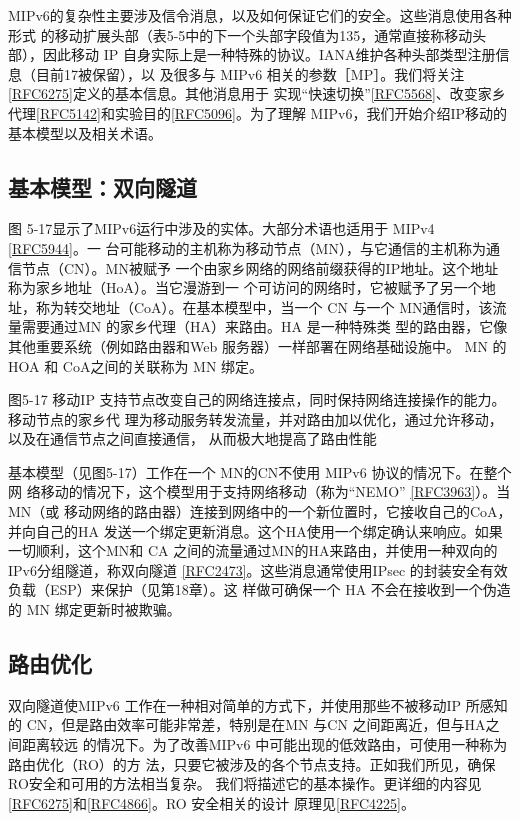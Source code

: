 MIPv6的复杂性主要涉及信令消息，以及如何保证它们的安全。这些消息使用各种形式
的移动扩展头部（表5-5中的下一个头部字段值为135，通常直接称移动头部），因此移动
IP 自身实际上是一种特殊的协议。IANA维护各种头部类型注册信息（目前17被保留），以
及很多与 MIPv6
相关的参数［MP］。我们将关注\href{https://www.rfc-editor.org/rfc/rfc6275}{[RFC6275]}定义的基本信息。其他消息用于
实现“快速切换”\href{https://www.rfc-editor.org/rfc/rfc5568}{[RFC5568]}、改变家乡代理\href{https://www.rfc-editor.org/rfc/rfc5142}{[RFC5142]}和实验目的\href{https://www.rfc-editor.org/rfc/rfc5096}{[RFC5096]}。为了理解
MIPv6，我们开始介绍IP移动的基本模型以及相关术语。

\subsection{基本模型：双向隧道}
图 5-17显示了MIPv6运行中涉及的实体。大部分术语也适用于 MIPv4
\href{https://www.rfc-editor.org/rfc/rfc5944}{[RFC5944]}。一
台可能移动的主机称为移动节点（MN），与它通信的主机称为通信节点（CN）。MN被赋予
一个由家乡网络的网络前缀获得的IP地址。这个地址称为家乡地址（HoA）。当它漫游到一
个可访问的网络时，它被赋予了另一个地址，称为转交地址（CoA）。在基本模型中，当一个
CN 与一个 MN通信时，该流量需要通过MN 的家乡代理（HA）来路由。HA 是一种特殊类
型的路由器，它像其他重要系统（例如路由器和Web 服务器）一样部署在网络基础设施中。
MN 的HOA 和 CoA之间的关联称为 MN 绑定。

图5-17 移动IP 支持节点改变自己的网络连接点，同时保持网络连接操作的能力。移动节点的家乡代
理为移动服务转发流量，并对路由加以优化，通过允许移动，以及在通信节点之间直接通信，
从而极大地提高了路由性能

基本模型（见图5-17）工作在一个 MN的CN不使用 MIPv6 协议的情况下。在整个网
络移动的情况下，这个模型用于支持网络移动（称为“NEMO”
\href{https://www.rfc-editor.org/rfc/rfc3963}{[RFC3963]}）。当MN（或
移动网络的路由器）连接到网络中的一个新位置时，它接收自己的CoA，并向自己的HA
发送一个绑定更新消息。这个HA使用一个绑定确认来响应。如果一切顺利，这个MN和
CA 之间的流量通过MN的HA来路由，并使用一种双向的IPv6分组隧道，称双向隧道
\href{https://www.rfc-editor.org/rfc/rfc2473}{[RFC2473]}。这些消息通常使用IPsec
的封装安全有效负载（ESP）来保护（见第18章）。这
样做可确保一个 HA 不会在接收到一个伪造的 MN 绑定更新时被欺骗。

\subsection{路由优化}
双向隧道使MIPv6 工作在一种相对简单的方式下，并使用那些不被移动IP 所感知的
CN，但是路由效率可能非常差，特别是在MN 与CN 之间距离近，但与HA之间距离较远
的情况下。为了改善MIPv6 中可能出现的低效路由，可使用一种称为路由优化（RO）的方
法，只要它被涉及的各个节点支持。正如我们所见，确保 RO安全和可用的方法相当复杂。
我们将描述它的基本操作。更详细的内容见\href{https://www.rfc-editor.org/rfc/rfc6275}{[RFC6275]}和\href{https://www.rfc-editor.org/rfc/rfc4866}{[RFC4866]}。RO
安全相关的设计
原理见\href{https://www.rfc-editor.org/rfc/rfc4225}{[RFC4225]}。

